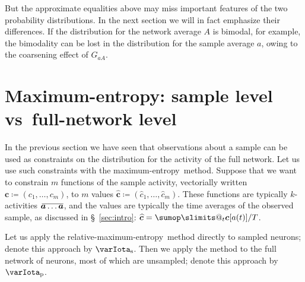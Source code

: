 \documentclass[\ifafour a4paper,12pt,\else a5paper,10pt,\fi%
onecolumn,oneside,article,%
british%
]{memoir}
\makeatletter
\theoremstyle{remark}
\theoremstyle{innote}
\def\sum{\DOTSI\sumop\slimits@}
\newcommand*{\citep}{\parencites}
\newcommand*{\defd}{\coloneqq}
\newcommand*{\pf}{\mathrm{p}}%
\renewcommand*{\|}{\nonscript\,\vert\nonscript\;\mathopen{}}
\newcommand*{\sect}{\S}%
\newcommand*{\vs}{{vs}}
\newcommand*{\widebar}[1]{{\mkern1.5mu\skew{2}\overline{\mkern-1.5mu#1\mkern-1.5mu}\mkern 1.5mu}}
\newcommand*{\sav}{\widebar} %
\newcommand*{\ypp}{G}
\newcommand*{\yAv}{A}
\newcommand*{\yav}{a}
\newcommand*{\yNv}{N}
\newcommand*{\yaa}{\bm{\yav}}%
\newcommand*{\ya}{\yav}%
\newcommand*{\yA}{\yAv}%
\newcommand*{\yHa}{\varIota_\textrm{p}}
\newcommand*{\yHb}{\varIota_\textrm{s}}
\newcommand*{\yg}{\bm{c}}
\newcommand*{\yc}{\widehat{\bm{c}}}
\newcommand*{\me}{maximum-entropy}
\makeatother
\begin{document}
But the approximate equalities above may miss important features of the two
probability distributions. In the next section we will in fact emphasize
their differences. If the distribution for the network average $\yA$ is
bimodal, for example, the bimodality can be lost in the distribution for
the sample average $\ya$, owing to the coarsening effect of
$\ypp_{\ya\yA}$.




\section{Maximum-entropy: sample level \vs\ full-network level}
\label{sec:specific_initial_probability}

In the previous section we have seen that observations about a sample can
be used as constraints on the distribution for the activity of the full
network. Let us use such constraints with the \me\ method. Suppose that
we want to constrain $m$ functions of the sample activity, vectorially
written $\yg \defd (c_1,\dotsc,c_m)$, to $m$ values
$\yc \defd (\widehat{c}_1,\dotsc,\widehat{c}_m)$. These functions are typically $k$-activities
$\sav{\yaa\dotso \yaa}$, and the values are typically the time averages of
the observed sample, as discussed in \sect~\ref{sec:intro}:
$\yc = \sum_t \yg[\ya(t)]/T$.

Let us apply the relative-\me\ method \citep{sivia1996_r2006,meadetal1984}
directly to sampled neurons; denote this approach by $\yHb$. Then we apply
the method to the full network of neurons, most of which are unsampled;
denote this approach by $\yHa$.
\end{document}
